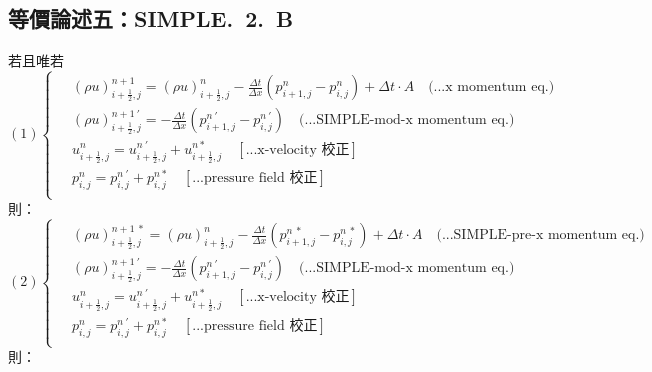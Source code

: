 \documentclass[12pt]{article}
\begin{document}
\subsection{等價論述五：SIMPLE.\ 2.\ B}
\label{2.B.e}
\noindent 若且唯若\\
\begin{equation}
(1)
\left\{
\begin{aligned}
    \ &(\rho u)_{i+\frac{1}{2},j}^{n+1} = (\rho u)_{i+\frac{1}{2},j}^{n} - \frac{\Delta t}{\Delta x}(p_{i+1,j}^{n} - p_{i,j}^{n}) + \Delta t \cdot A  \quad \text{(...x momentum eq.)}\\[1.5ex]
    \ &(\rho u)_{i+\frac{1}{2},j}^{n+1\ \prime} = - \frac{\Delta t}{\Delta x}(p_{i+1,j}^{n\ \prime} - p_{i,j}^{n\ \prime})  \quad \text{(...SIMPLE-mod-x momentum eq.)}\\[1.5ex]
    \ &u_{i+\frac{1}{2},j}^{n} = u_{i+\frac{1}{2},j}^{n\ '} + u_{i+\frac{1}{2},j}^{n *}  \quad \left[\text{...x-velocity 校正}\right]\\[1.5ex]
    \ &p_{i,j}^{n} = p_{i,j}^{n\ '} + p_{i,j}^{n *} \quad\left[\text{...pressure field 校正}\right]\\[1.5ex]
\end{aligned}
\right.
\end{equation}
\noindent 則：\\
\begin{equation}
(2)
\left\{
\begin{aligned}
    \ &(\rho u)_{i+\frac{1}{2},j}^{n+1\ *} = (\rho u)_{i+\frac{1}{2},j}^{n} - \frac{\Delta t}{\Delta x}(p_{i+1,j}^{n\ *} - p_{i,j}^{n\ *}) + \Delta t \cdot A \quad \text{(...SIMPLE-pre-x momentum eq.)}\\[1.5ex]
    \ &(\rho u)_{i+\frac{1}{2},j}^{n+1\ \prime} = - \frac{\Delta t}{\Delta x}(p_{i+1,j}^{n\ \prime} - p_{i,j}^{n\ \prime})  \quad \text{(...SIMPLE-mod-x momentum eq.)}\\[1.5ex]
    \ &u_{i+\frac{1}{2},j}^{n} = u_{i+\frac{1}{2},j}^{n\ '} + u_{i+\frac{1}{2},j}^{n *}  \quad \left[\text{...x-velocity 校正}\right]\\[1.5ex]
    \ &p_{i,j}^{n} = p_{i,j}^{n\ '} + p_{i,j}^{n *} \quad\left[\text{...pressure field 校正}\right]\\[1.5ex]
\end{aligned}
\right.
\end{equation}
\noindent 則：\\
\end{document}
